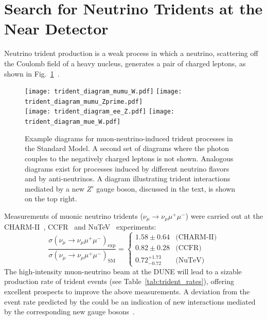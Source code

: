 \section{Search for Neutrino Tridents at the Near Detector}
Neutrino trident production is a weak process in which a neutrino, scattering off the Coulomb field of a heavy nucleus, generates a pair of charged leptons, as shown in Fig.~\ref{fig:diagrams}~\cite{Czyz:1964zz,Lovseth:1971vv,Fujikawa:1971nx,Koike:1971tu,Koike:1971vg,Brown:1973ih,Belusevic:1987cw}.
\begin{figure}[!hb]
\centering
\texttt{[image: trident\_diagram\_mumu\_W.pdf]} \qquad
\texttt{[image: trident\_diagram\_mumu\_Zprime.pdf]} \\[\baselineskip]
\texttt{[image: trident\_diagram\_ee\_Z.pdf]} \qquad
\texttt{[image: trident\_diagram\_mue\_W.pdf]} \\[\baselineskip]
\caption[Example diagrams for $\numu$-induced trident processes in the SM]{Example diagrams for muon-neutrino-induced trident processes in the Standard Model. A second set of diagrams where the photon couples to the negatively charged leptons is not shown. 
Analogous diagrams exist for processes induced by different neutrino flavors and by anti-neutrinos. A diagram illustrating trident interactions mediated by a new $Z'$ gauge boson, discussed in the text, is shown on the top right.}
\label{fig:diagrams}
\end{figure}
Measurements of muonic neutrino tridents ($\nu_\mu \to \nu_\mu \mu^+\mu^-$) were carried out at the CHARM-II~\cite{Geiregat:1990gz}, CCFR~\cite{Mishra:1991bv} and NuTeV~\cite{Adams:1999mn} experiments:
\[
\frac{\sigma(\nu_\mu \to \nu_\mu \mu^+\mu^-)_\text{exp}}{\sigma(\nu_\mu \to \nu_\mu \mu^+\mu^-)_\text{SM}} = 
\begin{cases}
1.58 \pm 0.64         & \text{(CHARM-II)} \\ 
0.82 \pm 0.28         & \text{(CCFR)} \\
0.72 ^{+1.73}_{-0.72} & \text{(NuTeV)} 
\end{cases}
\]
The high-intensity muon-neutrino beam at the DUNE   will lead to a sizable production rate of trident events (see Table~\ref{tab:trident_rates}), offering excellent prospects to improve the above measurements. A deviation from the event rate predicted by the  could be an indication of new interactions mediated by the corresponding new gauge bosons~\cite{Altmannshofer:2014pba}. 


